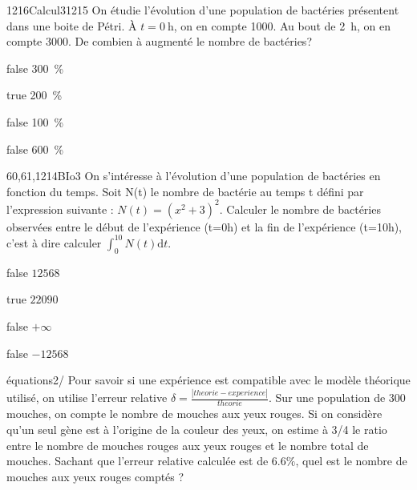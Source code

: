 \documentclass[11pt]{article}
\begin{document}
			
			\begin{question}{1216}{Calcul}{3}{1215}
                On étudie l'évolution d'une population de bactéries présentent dans une boite de Pétri. À $t=\SI{0}{\hour}$, on en compte \num{1000}. Au bout de \SI{2}{\hour}, on en compte \num{3000}. De combien à augmenté le nombre de bactéries? 
            \end{question}

            \begin{reponses}
            	\item[false] \SI{300}{\percent}
            	\item[true]  \SI{200}{\percent}
                \item[false] \SI{100}{\percent}
                \item[false] \SI{600}{\percent}
            \end{reponses}
        
       

         \begin{question}{60,61,1214}{BIo}{3}{}
          On s'intéresse à l'évolution d'une population de bactéries en fonction du temps. Soit N(t) le nombre de bactérie au temps t défini par l'expression suivante : $N(t) = (x^2+3)^2 $. Calculer le nombre de bactéries observées entre le début de l'expérience (t=0h) et la fin de l'expérience (t=10h), c'est à dire calculer $\int^{10}_{0} N(t) \mathrm{d}t$.
        \end{question}
        \begin{reponses}
            \item[false] $12568$
            \item[true] $22090$
            \item[false]  $+\infty$
            \item[false] $-12568$
        \end{reponses}
			

            \begin{question}{8}{équations}{2}{/} 
            	Pour savoir si une expérience est compatible avec le modèle théorique utilisé, on utilise l'erreur relative $\delta = \frac{|theorie-experience|}{theorie}$. Sur une population de 300 mouches, on compte le nombre de mouches aux yeux rouges. Si on considère qu'un seul gène est à l'origine de la couleur des yeux, on estime à 3/4 le ratio entre le nombre de mouches rouges aux yeux rouges et le nombre total de mouches. Sachant que l'erreur relative calculée est de $6.6\%$, quel est le nombre de mouches aux yeux rouges comptés ? 
            \end{question}
\end{document}
